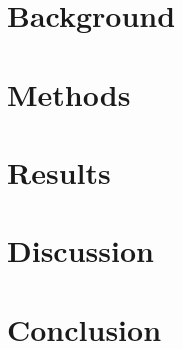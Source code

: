




\chapter{Background}










\chapter{Methods}



\chapter{Results}



\chapter{Discussion}


\chapter{Conclusion}


\printbibliography

\begin{appendices}


\end{appendices}


